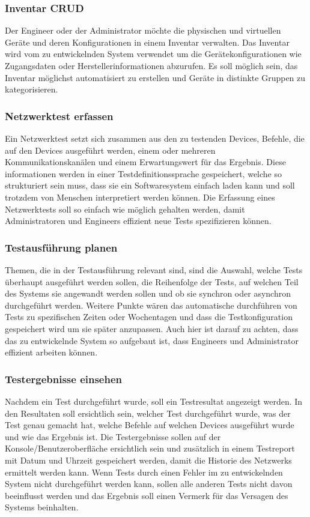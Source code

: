 \documentclass[
	ngerman,
	toc=listof, %
	toc=bibliography, %
	footnotes=multiple, %
	parskip=half, %
	numbers=noendperiod %
]{scrartcl}
\begin{document}
		\subsubsection{Inventar CRUD}
			Der Engineer oder der Administrator möchte die physischen und virtuellen Geräte und deren Konfigurationen in einem Inventar verwalten.
			Das Inventar wird vom zu entwickelnden System verwendet um die Gerätekonfigurationen wie Zugangsdaten oder Herstellerinformationen abzurufen.
			Es soll möglich sein, das Inventar möglichst automatisiert zu erstellen und Geräte in distinkte Gruppen zu kategorisieren.

		\subsubsection{Netzwerktest erfassen}
			Ein Netzwerktest setzt sich zusammen aus den zu testenden Devices, Befehle, die auf den Devices ausgeführt werden, einem oder mehreren Kommunikationskanälen und einem Erwartungswert für das Ergebnis.
			Diese informationen werden in einer Testdefinitionssprache gespeichert, welche so strukturiert sein muss, dass sie ein Softwaresystem einfach laden kann und soll trotzdem von Menschen interpretiert werden können.
			Die Erfassung eines Netzwerktests soll so einfach wie möglich gehalten werden, damit Administratoren und Engineers effizient neue Tests spezifizieren können.

		\subsubsection{Testausführung planen}
			Themen, die in der Testausführung relevant sind, sind die Auswahl, welche Tests überhaupt ausgeführt werden sollen, die Reihenfolge der Tests, auf welchen Teil des Systems sie angewandt werden sollen und ob sie synchron oder asynchron durchgeführt werden.
			Weitere Punkte wären das automatische durchführen von Tests zu spezifischen Zeiten oder Wochentagen und dass die Testkonfiguration gespeichert wird um sie später anzupassen.
			Auch hier ist darauf zu achten, dass das zu entwickelnde System so aufgebaut ist, dass Engineers und Administrator effizient arbeiten können.

		\subsubsection{Testergebnisse einsehen}
			Nachdem ein Test durchgeführt wurde, soll ein Testresultat angezeigt werden.
			In den Resultaten soll ersichtlich sein, welcher Test durchgeführt wurde, was der Test genau gemacht hat, welche Befehle auf welchen Devices ausgeführt wurde und wie das Ergebnis ist.
			Die Testergebnisse sollen auf der Konsole/Benutzeroberfläche ersichtlich sein und zusätzlich in einem Testreport mit Datum und Uhrzeit gespeichert werden, damit die Historie des Netzwerks ermittelt werden kann.
			Wenn Tests durch einen Fehler im zu entwickelnden System nicht durchgeführt werden kann, sollen alle anderen Tests nicht davon beeinflusst werden und das Ergebnis soll einen Vermerk für das Versagen des Systems beinhalten.
	
\end{document}
